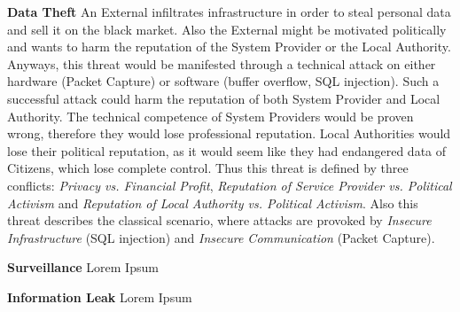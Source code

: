 %
%
%
\textbf{Data Theft}
An External infiltrates infrastructure in order to steal personal data and sell it on the black market. 
Also the External might be motivated politically and wants to harm the reputation of the System Provider or the Local Authority.
Anyways, this threat would be manifested through a technical attack on either hardware (Packet Capture) or software (buffer overflow, SQL injection).
Such a successful attack could harm the reputation of both System Provider and Local Authority.
The technical competence of System Providers would be proven wrong, therefore they would lose professional reputation.
Local Authorities would lose their political reputation, as it would seem like they had endangered data of Citizens, which lose complete control.
Thus this threat is defined by three conflicts: \textit{Privacy vs. Financial Profit}, \textit{ Reputation of Service Provider vs. Political Activism} and \textit{Reputation of Local Authority vs. Political Activism}.
Also this threat describes the classical scenario, where attacks are provoked by \textit{Insecure Infrastructure} (SQL injection) and \textit{Insecure Communication} (Packet Capture).


%
%
%
%
\textbf{Surveillance}
Lorem Ipsum



%
%
%
\textbf{Information Leak}
Lorem Ipsum



